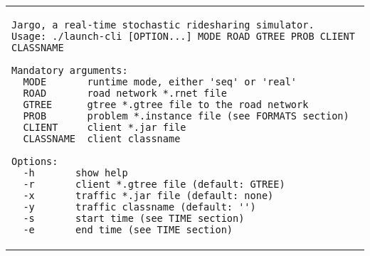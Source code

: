 \begin{tabular}{p{}}
\begin{verbatim}
Jargo, a real-time stochastic ridesharing simulator.
Usage: ./launch-cli [OPTION...] MODE ROAD GTREE PROB CLIENT CLASSNAME

Mandatory arguments:
  MODE       runtime mode, either 'seq' or 'real'
  ROAD       road network *.rnet file
  GTREE      gtree *.gtree file to the road network
  PROB       problem *.instance file (see FORMATS section)
  CLIENT     client *.jar file
  CLASSNAME  client classname

Options:
  -h       show help
  -r       client *.gtree file (default: GTREE)
  -x       traffic *.jar file (default: none)
  -y       traffic classname (default: '')
  -s       start time (see TIME section)
  -e       end time (see TIME section)
\end{verbatim}\\
\end{tabular}
